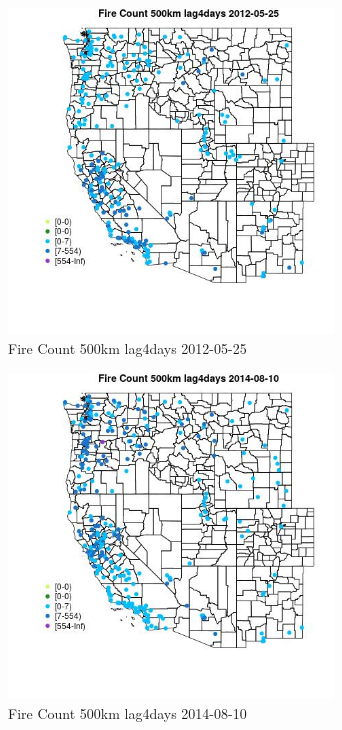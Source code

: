 \begin{figure} 
\centering  
\includegraphics[width=0.77\textwidth]{Code_Outputs/Report_ML_input_PM25_Step4_part_e_de_duplicated_aves_compiled_2019-05-18wNAs_MapObsFire_Count_500km_lag4days2012-05-25.jpg} 
\caption{\label{fig:Report_ML_input_PM25_Step4_part_e_de_duplicated_aves_compiled_2019-05-18wNAsMapObsFire_Count_500km_lag4days2012-05-25}Fire Count 500km lag4days 2012-05-25} 
\end{figure} 
 

\begin{figure} 
\centering  
\includegraphics[width=0.77\textwidth]{Code_Outputs/Report_ML_input_PM25_Step4_part_e_de_duplicated_aves_compiled_2019-05-18wNAs_MapObsFire_Count_500km_lag4days2014-08-10.jpg} 
\caption{\label{fig:Report_ML_input_PM25_Step4_part_e_de_duplicated_aves_compiled_2019-05-18wNAsMapObsFire_Count_500km_lag4days2014-08-10}Fire Count 500km lag4days 2014-08-10} 
\end{figure} 
 

